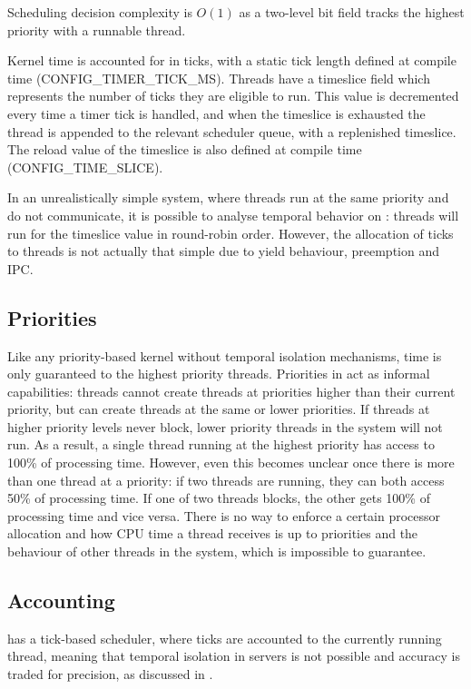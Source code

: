 Scheduling decision complexity is $O(1)$ as a two-level bit field tracks the highest priority with a runnable thread.

Kernel time is accounted for in ticks, with a static tick length defined at compile time (CONFIG\_TIMER\_TICK\_MS).
Threads have a timeslice field which represents the number of ticks they are eligible to run. 
This value is decremented every time a timer tick is handled, and when the timeslice is exhausted the thread is appended to the relevant scheduler queue, with a replenished timeslice.
The reload value of the timeslice is also defined at compile time (CONFIG\_TIME\_SLICE).

In an unrealistically simple system, where threads run at the same priority and do not communicate, it is possible to analyse temporal behavior on \selfour: threads will run for the timeslice value in round-robin order.
However, the allocation of ticks to threads is not actually that simple due to yield behaviour, preemption and \gls{IPC}. 

\subsection{Priorities}

Like any priority-based kernel without temporal isolation mechanisms, time is only guaranteed to the highest priority threads.
Priorities in \selfour act as informal capabilities: threads cannot create threads at priorities higher than their current priority, but can create threads at the same or lower priorities.
If threads at higher priority levels never block, lower priority threads in the system will not run.
As a result, a single thread running at the highest priority has access to 100\% of processing time.
However, even this becomes unclear once there is more than one thread at a priority: if two threads are running, they can both access 50\% of processing time.
If one of two threads blocks, the other gets 100\% of processing time and vice versa.
There is no way to enforce a certain processor allocation and how CPU time a thread receives is up
to priorities and the behaviour of other threads in the system, which is impossible to guarantee.

\subsection{Accounting}
\selfour has a tick-based scheduler, where ticks are accounted to the currently running thread,
meaning that temporal isolation in servers is not possible and accuracy is traded for precision, as
discussed in .

